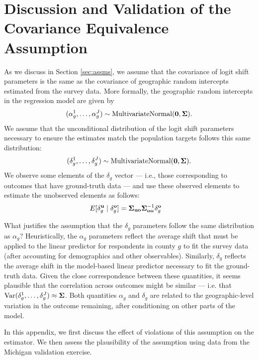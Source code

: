 \section{Discussion and Validation of the Covariance Equivalence Assumption}
\label{apx:covariance-assumption}
As we discuss in Section \ref{sec:assms}, we assume that the covariance of logit shift parameters is the same as the covariance of geographic random intercepts estimated from the survey data.  More formally, the geographic random intercepts in the regression model are given by
\begin{align*}
	(\alpha_g^1, \dots, \alpha_g^J) \sim \text{MultivariateNormal}(\mathbf{0}, \mathbf{\Sigma}).
\end{align*}
We assume that the unconditional distribution of the logit shift parameters necessary to ensure the estimates match the population targets follows this same distribution:
\begin{align*}
		(\delta_g^1, \dots, \delta_g^J) \sim \text{MultivariateNormal}(\mathbf{0}, \mathbf{\Sigma}).
\end{align*}
We observe some elements of the $\delta_g$ vector --- i.e., those corresponding to outcomes that have ground-truth data --- and use these observed elements to estimate the unobserved elements as follows:
\begin{align*}
E[\delta_g^{\mathbf{u}} \mid \delta_g^{\mathbf{o}}] &= \mathbf{\Sigma}_{\mathbf{uo}} \mathbf{\Sigma}_{\mathbf{oo}}^{-1} \delta_g^{\mathbf{o}}
\end{align*}

What justifies the assumption that the $\delta_g$ parameters follow the same distribution as $\alpha_g$? Heuristically, the $\alpha_g$ parameters reflect the average shift that must be applied to the linear predictor for respondents in county $g$ to fit the survey data (after accounting for demographics and other observables). Similarly, $\delta_g$ reflects the average shift in the model-based linear predictor necessary to fit the ground-truth data.  Given the close correspondence between these quantities, it seems plausible that the correlation across outcomes might be similar --- i.e. that $\text{Var}(\delta_g^1, \dots, \delta_g^J) \approx \mathbf{\Sigma}$. Both quantities $\alpha_g$ and $\delta_g$ are related to the  geographic-level variation in the outcome remaining, after conditioning on other parts of the model. 

In this appendix, we first discuss the effect of violations of this assumption on the estimator. We then assess the plausibility of the assumption using data from the Michigan validation exercise. 




